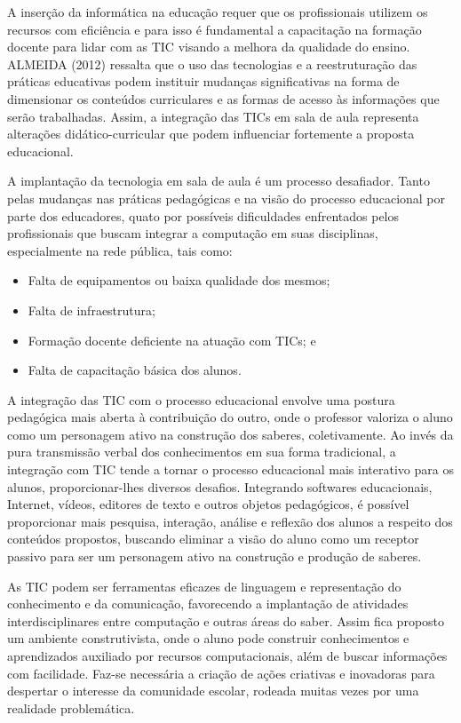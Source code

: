     
	A inserção da informática na educação requer que os profissionais utilizem os recursos com eficiência e para isso é fundamental a capacitação na formação docente para lidar com as TIC visando a melhora da qualidade do ensino. ALMEIDA (2012) ressalta que o uso das tecnologias e a reestruturação das práticas educativas podem instituir mudanças significativas na forma de dimensionar os conteúdos curriculares e as formas de acesso às informações que serão trabalhadas. Assim, a integração das TICs em sala de aula representa alterações didático-curricular que podem influenciar fortemente a proposta educacional.	
    
    
	A implantação da tecnologia em sala de aula é um processo desafiador. Tanto pelas mudanças nas práticas pedagógicas e na visão do processo educacional por parte dos educadores, quato por possíveis dificuldades enfrentados pelos profissionais que buscam integrar a computação em suas disciplinas, especialmente na rede pública, tais como:
    	\begin{itemize}
		\item Falta de equipamentos ou baixa qualidade dos mesmos;
		\item Falta de infraestrutura;
		\item Formação docente deficiente na atuação com TICs; e
		\item Falta de capacitação básica dos alunos.
        \end{itemize}
        
	 A integração das TIC com o processo educacional envolve uma postura pedagógica mais aberta à contribuição do outro, onde o professor valoriza o aluno como um personagem ativo na construção dos saberes, coletivamente. Ao invés da pura transmissão verbal dos conhecimentos em sua forma tradicional, a integração com TIC tende a tornar o processo educacional mais interativo para os alunos, proporcionar-lhes diversos desafios. Integrando softwares educacionais, Internet, vídeos, editores de texto e outros objetos pedagógicos, é possível proporcionar mais pesquisa, interação, análise e reflexão dos alunos a respeito dos conteúdos propostos, buscando eliminar a visão do aluno como um receptor passivo para ser um personagem ativo na construção e produção de saberes.
     
     
	As TIC podem ser ferramentas eficazes de linguagem e representação do conhecimento e da comunicação, favorecendo a implantação de atividades interdisciplinares entre computação e outras áreas do saber. Assim fica proposto um ambiente construtivista, onde o aluno pode construir conhecimentos e aprendizados auxiliado por recursos computacionais, além de buscar informações com facilidade. Faz-se necessária a criação de ações criativas e inovadoras para despertar o interesse da comunidade escolar, rodeada muitas vezes por uma realidade problemática.
    
